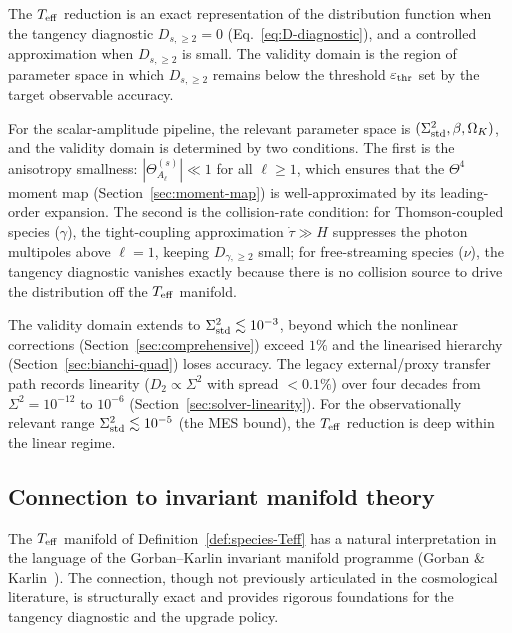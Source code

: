 The $T_{\mathrm{eff}}$ reduction is an exact representation of the
distribution function when the tangency diagnostic
$D_{s,\geq 2} = 0$ (Eq.~\ref{eq:D-diagnostic}), and a
controlled approximation when $D_{s,\geq 2}$ is small.
The validity domain is the region of parameter space
in which $D_{s,\geq 2}$ remains below the threshold
$\varepsilon_{\rm thr}$ set by the target observable
accuracy.

For the scalar-amplitude pipeline, the relevant
parameter space is $(\Sigma^2_{\mathrm{std}}, \beta, \Omega_K)$, and
the validity domain is determined by two conditions.
The first is the anisotropy smallness:
$|\Theta^{(s)}_{A_\ell}| \ll 1$ for all $\ell \geq 1$,
which ensures that the $\Theta^4$ moment map
(Section~\ref{sec:moment-map}) is well-approximated
by its leading-order expansion.  The second is the
collision-rate condition: for Thomson-coupled species
($\gamma$), the tight-coupling approximation
$\dot{\tau} \gg H$ suppresses the photon multipoles
above $\ell = 1$, keeping $D_{\gamma,\geq 2}$ small;
for free-streaming species ($\nu$), the tangency
diagnostic vanishes exactly because there is no collision
source to drive the distribution off the $T_{\mathrm{eff}}$
manifold.

The validity domain extends to
$\Sigma^2_{\mathrm{std}} \lesssim 10^{-3}$, beyond which the
nonlinear corrections (Section~\ref{sec:comprehensive})
exceed $1\%$ and the linearised hierarchy
(Section~\ref{sec:bianchi-quad}) loses accuracy.  The
legacy external/proxy transfer path records linearity
($D_2 \propto \Sigma^2$ with spread $< 0.1\%$) over four decades
from $\Sigma^2 = 10^{-12}$ to $10^{-6}$
(Section~\ref{sec:solver-linearity}).  For the
observationally relevant range
$\Sigma^2_{\mathrm{std}} \lesssim 10^{-5}$ (the MES bound), the
$T_{\mathrm{eff}}$ reduction is deep within the linear regime.


\subsection{Connection to invariant manifold theory}
\label{sec:invariant-manifold}

The $T_{\mathrm{eff}}$ manifold of
Definition~\ref{def:species-Teff} has a natural
interpretation in the language of the Gorban--Karlin
invariant manifold programme
(Gorban \& Karlin~\cite{GorbanKarlin2005}).  The
connection, though not previously articulated in the
cosmological literature, is structurally exact and
provides rigorous foundations for the tangency
diagnostic and the upgrade policy.


